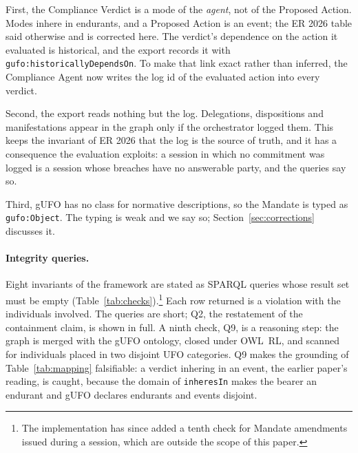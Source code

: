 \documentclass[runningheads]{llncs}
\newcommand{\code}[1]{\texttt{#1}}
\begin{document}
First, the Compliance Verdict is a mode of the \emph{agent}, not of the Proposed Action. Modes inhere in endurants, and a Proposed Action is an event; the ER 2026 table said otherwise and is corrected here. The verdict's dependence on the action it evaluated is historical, and the export records it with \code{gufo:historicallyDependsOn}. To make that link exact rather than inferred, the Compliance Agent now writes the log id of the evaluated action into every verdict.

Second, the export reads nothing but the log. Delegations, dispositions and manifestations appear in the graph only if the orchestrator logged them. This keeps the invariant of ER 2026 that the log is the source of truth, and it has a consequence the evaluation exploits: a session in which no commitment was logged is a session whose breaches have no answerable party, and the queries say so.

Third, gUFO has no class for normative descriptions, so the Mandate is typed as \code{gufo:Object}. The typing is weak and we say so; Section~\ref{sec:corrections} discusses it.

\paragraph{Integrity queries.}
Eight invariants of the framework are stated as SPARQL queries whose result set must be empty (Table~\ref{tab:checks}).\footnote{The implementation has since added a tenth check for Mandate amendments issued during a session, which are outside the scope of this paper.} Each row returned is a violation with the individuals involved. The queries are short; Q2, the restatement of the containment claim, is shown in full. A ninth check, Q9, is a reasoning step: the graph is merged with the gUFO ontology, closed under OWL~RL, and scanned for individuals placed in two disjoint UFO categories. Q9 makes the grounding of Table~\ref{tab:mapping} falsifiable: a verdict inhering in an event, the earlier paper's reading, is caught, because the domain of \code{inheresIn} makes the bearer an endurant and gUFO declares endurants and events disjoint.
\end{document}
